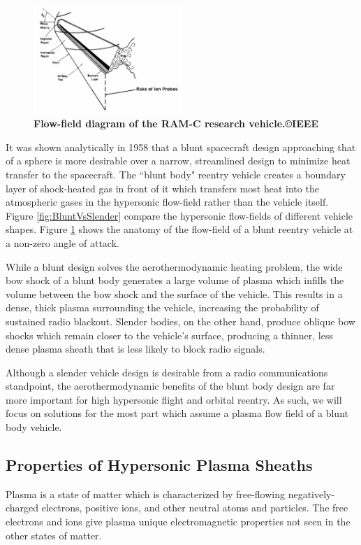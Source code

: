 \documentclass[twocolumn]{article}
\begin{document}
\begin{figure}
	\centering
	\includegraphics[width=0.5\textwidth]{Images/RAMC_FlowField.png}
	\caption{\textbf{Flow-field diagram of the RAM-C research vehicle.\cite{rybak_causes_1970}\copyright IEEE}}
	\label{fig:RAMCFlowField}
\end{figure}

It was shown analytically in 1958 that a blunt spacecraft design approaching that of a sphere is more desirable over a narrow, streamlined design to minimize heat transfer to the spacecraft.\cite{allen_study_1958}
The ``blunt body" reentry vehicle creates a boundary layer of shock-heated gas in front of it which transfers most heat into the atmospheric gases in the hypersonic flow-field rather than the vehicle itself.
Figure \ref{fig:BluntVsSlender} compare the hypersonic flow-fields of different vehicle shapes.
Figure \ref{fig:RAMCFlowField} shows the anatomy of the flow-field of a blunt reentry vehicle at a non-zero angle of attack.

While a blunt design solves the aerothermodynamic heating problem, the wide bow shock of a blunt body generates a large volume of plasma which infills the volume between the bow shock and the surface of the vehicle.
This results in a dense, thick plasma surrounding the vehicle, increasing the probability of sustained radio blackout.
Slender bodies, on the other hand, produce oblique bow shocks which remain closer to the vehicle's surface, producing a thinner, less dense plasma sheath that is less likely to block radio signals.\cite{hartunian_implications_2007}

Although a slender vehicle design is desirable from a radio communications standpoint, the aerothermodynamic benefits of the blunt body design are far more important for high hypersonic flight and orbital reentry.
As such, we will focus on solutions for the most part which assume a plasma flow field of a blunt body vehicle.


\subsection*{Properties of Hypersonic Plasma Sheaths}
Plasma is a state of matter which is characterized by free-flowing negatively-charged electrons, positive ions, and other neutral atoms and particles.
The free electrons and ions give plasma unique electromagnetic properties not seen in the other states of matter.
\end{document}
